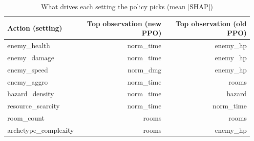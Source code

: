 \begin{table}[ht]
\centering
\small
\begin{tabular}{lrr}
\toprule
Action (setting) & Top observation (new PPO) & Top observation (old PPO) \\
\midrule
enemy\_health & norm\_time & enemy\_hp \\
enemy\_damage & norm\_time & enemy\_hp \\
enemy\_speed & norm\_dmg & enemy\_hp \\
enemy\_aggro & norm\_time & rooms \\
hazard\_density & norm\_time & hazard \\
resource\_scarcity & norm\_time & norm\_time \\
room\_count & rooms & rooms \\
archetype\_complexity & rooms & enemy\_hp \\
\bottomrule
\end{tabular}
\caption{What drives each setting the policy picks (mean |SHAP|)}
\label{tab:policy_shap_top}
\end{table}
